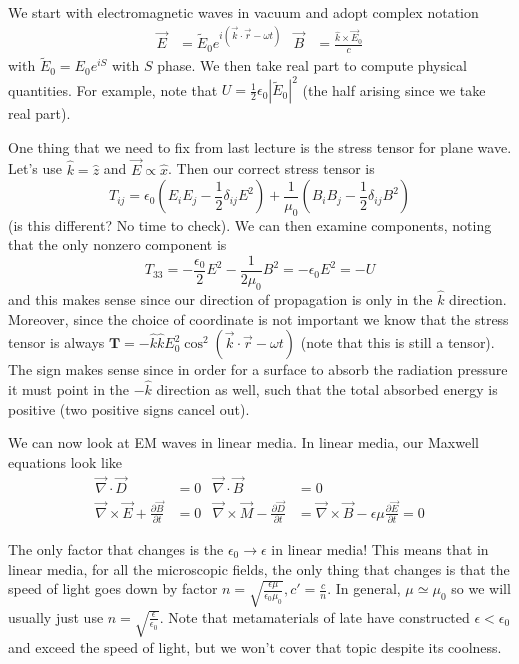 \documentclass[10pt]{report}
\newcommand{\pd}[2]{\frac{\partial #1}{\partial#2}}
\newcommand{\abs}[1]{\left|#1\right|}
\begin{document}
We start with electromagnetic waves in vacuum and adopt complex notation
\begin{align}
    \vec{E} &= \tilde{E}_0 e^{i(\vec{k} \cdot \vec{r} - \omega t)} & \vec{B} &= \frac{\hat{k} \times \vec{E}_0}{c}
\end{align}
with $\tilde{E}_0 = E_0 e^{iS}$ with $S$ phase. We then take real part to compute physical quantities. For example, note that $U = \frac{1}{2}\epsilon_0 \abs{\tilde{E}_0}^2$ (the half arising since we take real part).

One thing that we need to fix from last lecture is the stress tensor for plane wave. Let's use $\hat{k} = \hat{z}$ and $\vec{E} \propto \hat{x}$. Then our correct stress tensor is
\begin{equation}
    T_{ij} = \epsilon_0\left( E_iE_j - \frac{1}{2}\delta_{ij}E^2 \right) + \frac{1}{\mu_0}\left( B_i B_j - \frac{1}{2}\delta_{ij}B^2 \right)
\end{equation}
(is this different? No time to check). We can then examine components, noting that the only nonzero component is 
\begin{equation}
    T_{33} = -\frac{\epsilon_0}{2}E^2 - \frac{1}{2\mu_0}B^2 = -\epsilon_0E^2 = -U
\end{equation}
and this makes sense since our direction of propagation is only in the $\hat{k}$ direction. Moreover, since the choice of coordinate is not important we know that the stress tensor is always $\mathbf{T} = -\hat{k} \hat{k} E_0^2 \cos^2\left( \vec{k} \cdot \vec{r} - \omega t \right)$ (note that this is still a tensor). The sign makes sense since in order for a surface to absorb the radiation pressure it must point in the $-\hat{k}$ direction as well, such that the total absorbed energy is positive (two positive signs cancel out). 

We can now look at EM waves in linear media. In linear media, our Maxwell equations look like
\begin{align}
    \vec{\nabla} \cdot \vec{D} &= 0 & \vec{\nabla} \cdot \vec{B} &= 0\\
    \vec{\nabla} \times \vec{E} + \pd{\vec{B}}{t} &= 0 & \vec{\nabla} \times \vec{M} - \pd{\vec{D}}{t} &= \vec{\nabla } \times \vec{B} - \epsilon \mu \pd{\vec{E}}{t} =0
\end{align}

The only factor that changes is the $\epsilon_0 \to \epsilon$ in linear media! This means that in linear media, for all the microscopic fields, the only thing that changes is that the speed of light goes down by factor $n = \sqrt{\frac{\epsilon \mu}{\epsilon_0 \mu_0}}, c' = \frac{c}{n}$. In general, $\mu \simeq \mu_0$ so we will usually just use $n = \sqrt{\frac{\epsilon}{\epsilon_0}}$. Note that metamaterials of late have constructed $\epsilon < \epsilon_0$ and exceed the speed of light, but we won't cover that topic despite its coolness.
\end{document}
